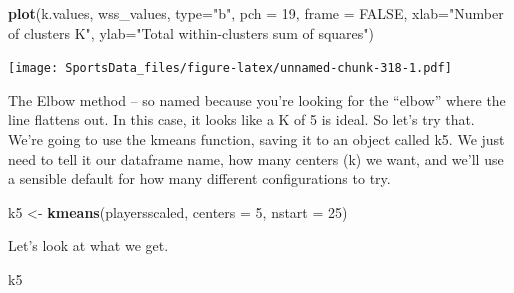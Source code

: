 \documentclass[
]{book}
\newenvironment{Shaded}{\begin{snugshade}}{\end{snugshade}}
\newcommand{\DataTypeTok}[1]{\textcolor[rgb]{0.13,0.29,0.53}{#1}}
\newcommand{\DecValTok}[1]{\textcolor[rgb]{0.00,0.00,0.81}{#1}}
\newcommand{\KeywordTok}[1]{\textcolor[rgb]{0.13,0.29,0.53}{\textbf{#1}}}
\newcommand{\NormalTok}[1]{#1}
\newcommand{\OtherTok}[1]{\textcolor[rgb]{0.56,0.35,0.01}{#1}}
\newcommand{\StringTok}[1]{\textcolor[rgb]{0.31,0.60,0.02}{#1}}
\begin{document}
\begin{Shaded}
\begin{Highlighting}[]
\KeywordTok{plot}\NormalTok{(k.values, wss_values,}
       \DataTypeTok{type=}\StringTok{"b"}\NormalTok{, }\DataTypeTok{pch =} \DecValTok{19}\NormalTok{, }\DataTypeTok{frame =} \OtherTok{FALSE}\NormalTok{, }
       \DataTypeTok{xlab=}\StringTok{"Number of clusters K"}\NormalTok{,}
       \DataTypeTok{ylab=}\StringTok{"Total within-clusters sum of squares"}\NormalTok{)}
\end{Highlighting}
\end{Shaded}

\texttt{[image: SportsData\_files/figure-latex/unnamed-chunk-318-1.pdf]}

The Elbow method -- so named because you're looking for the ``elbow'' where the line flattens out. In this case, it looks like a K of 5 is ideal. So let's try that. We're going to use the kmeans function, saving it to an object called k5. We just need to tell it our dataframe name, how many centers (k) we want, and we'll use a sensible default for how many different configurations to try.

\begin{Shaded}
\begin{Highlighting}[]
\NormalTok{k5 <-}\StringTok{ }\KeywordTok{kmeans}\NormalTok{(playersscaled, }\DataTypeTok{centers =} \DecValTok{5}\NormalTok{, }\DataTypeTok{nstart =} \DecValTok{25}\NormalTok{)}
\end{Highlighting}
\end{Shaded}

Let's look at what we get.

\begin{Shaded}
\begin{Highlighting}[]
\NormalTok{k5}
\end{Highlighting}
\end{Shaded}
\end{document}
